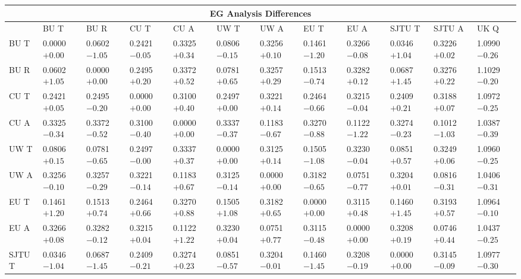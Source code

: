 \begin{landscape}
\begin{table}
\small
\centering
\renewcommand{\arraystretch}{1.5}
\begin{tabularx}{1\linewidth}{@{\extracolsep{\fill}}lXXXXXXXXXXX}
  \toprule
  	\multicolumn{12}{c}{{\normalsize EG Analysis Differences}} \\
  \midrule
  	       & BU T & BU R & CU T & CU A & UW T & UW A & EU T & EU A & SJTU T & SJTU A & UK Q \\
  \midrule
	BU T   & 0.0000 $+0.00$ & 0.0602 $-1.05$ & 0.2421 $-0.05$ & 0.3325 $+0.34$ & 0.0806 $-0.15$ & 0.3256 $+0.10$ & 0.1461 $-1.20$ & 0.3266 $-0.08$ & 0.0346 $+1.04$ & 0.3226 $+0.02$ & 1.0990 $-0.26$  \\
	BU R   & 0.0602 $+1.05$ & 0.0000 $+0.00$ & 0.2495 $+0.20$ & 0.3372 $+0.52$ & 0.0781 $+0.65$ & 0.3257 $+0.29$ & 0.1513 $-0.74$ & 0.3282 $+0.12$ & 0.0687 $+1.45$ & 0.3276 $+0.22$ & 1.1029 $-0.20$  \\
	CU T   & 0.2421 $+0.05$ & 0.2495 $-0.20$ & 0.0000 $+0.00$ & 0.3100 $+0.40$ & 0.2497 $+0.00$ & 0.3221 $+0.14$ & 0.2464 $-0.66$ & 0.3215 $-0.04$ & 0.2409 $+0.21$ & 0.3188 $+0.07$ & 1.0972 $-0.25$  \\
	CU A   & 0.3325 $-0.34$ & 0.3372 $-0.52$ & 0.3100 $-0.40$ & 0.0000 $+0.00$ & 0.3337 $-0.37$ & 0.1183 $-0.67$ & 0.3270 $-0.88$ & 0.1122 $-1.22$ & 0.3274 $-0.23$ & 0.1012 $-1.03$ & 1.0387 $-0.39$  \\
	UW T   & 0.0806 $+0.15$ & 0.0781 $-0.65$ & 0.2497 $-0.00$ & 0.3337 $+0.37$ & 0.0000 $+0.00$ & 0.3125 $+0.14$ & 0.1505 $-1.08$ & 0.3230 $-0.04$ & 0.0851 $+0.57$ & 0.3249 $+0.06$ & 1.0960 $-0.25$  \\
	UW A   & 0.3256 $-0.10$ & 0.3257 $-0.29$ & 0.3221 $-0.14$ & 0.1183 $+0.67$ & 0.3125 $-0.14$ & 0.0000 $+0.00$ & 0.3182 $-0.65$ & 0.0751 $-0.77$ & 0.3204 $+0.01$ & 0.0816 $-0.31$ & 1.0406 $-0.31$  \\
	EU T   & 0.1461 $+1.20$ & 0.1513 $+0.74$ & 0.2464 $+0.66$ & 0.3270 $+0.88$ & 0.1505 $+1.08$ & 0.3182 $+0.65$ & 0.0000 $+0.00$ & 0.3115 $+0.48$ & 0.1460 $+1.45$ & 0.3193 $+0.57$ & 1.0964 $-0.10$  \\
	EU A   & 0.3266 $+0.08$ & 0.3282 $-0.12$ & 0.3215 $+0.04$ & 0.1122 $+1.22$ & 0.3230 $+0.04$ & 0.0751 $+0.77$ & 0.3115 $-0.48$ & 0.0000 $+0.00$ & 0.3208 $+0.19$ & 0.0746 $+0.44$ & 1.0437 $-0.25$  \\
	SJTU T & 0.0346 $-1.04$ & 0.0687 $-1.45$ & 0.2409 $-0.21$ & 0.3274 $+0.23$ & 0.0851 $-0.57$ & 0.3204 $-0.01$ & 0.1460 $-1.45$ & 0.3208 $-0.19$ & 0.0000 $+0.00$ & 0.3145 $-0.09$ & 1.0977 $-0.30$  \\

\end{tabularx}
\end{table}
\end{landscape}
